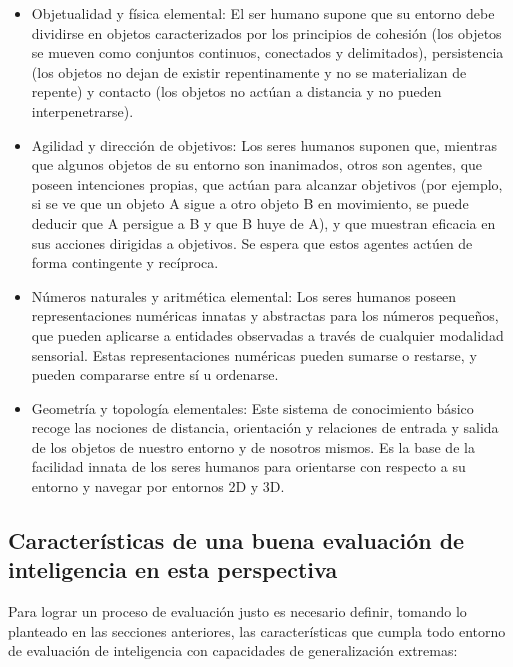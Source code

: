 \begin{itemize}

\item Objetualidad y física elemental: El ser humano supone que su entorno debe dividirse en objetos caracterizados por los principios de cohesión (los objetos se mueven como conjuntos continuos, conectados y delimitados), persistencia (los objetos no dejan de existir repentinamente y no se materializan de repente) y contacto (los objetos no actúan a distancia y no pueden interpenetrarse).

\item Agilidad y dirección de objetivos: Los seres humanos suponen que, mientras que algunos objetos de su entorno son inanimados, otros son agentes, que poseen intenciones propias, que actúan para alcanzar objetivos (por ejemplo, si se ve que un objeto A sigue a otro objeto B en movimiento, se puede deducir que A persigue a B y que B huye de A), y que muestran eficacia en sus acciones dirigidas a objetivos. Se espera que estos agentes actúen de forma contingente y recíproca.

\item Números naturales y aritmética elemental: Los seres humanos poseen representaciones numéricas innatas y abstractas para los números pequeños, que pueden aplicarse a entidades observadas a través de cualquier modalidad sensorial. Estas representaciones numéricas pueden sumarse o restarse, y pueden compararse entre sí u ordenarse.

\item Geometría y topología elementales: Este sistema de conocimiento básico recoge las nociones de distancia, orientación y relaciones de entrada y salida de los objetos de nuestro entorno y de nosotros mismos. Es la base de la facilidad innata de los seres humanos para orientarse con respecto a su entorno y navegar por entornos 2D y 3D.
\end{itemize}

\subsection{Características de una buena evaluación de inteligencia en esta perspectiva}

Para lograr un proceso de evaluación justo es necesario definir, tomando lo planteado en las secciones anteriores, las características que cumpla todo entorno de evaluación de inteligencia con capacidades de generalización extremas:

